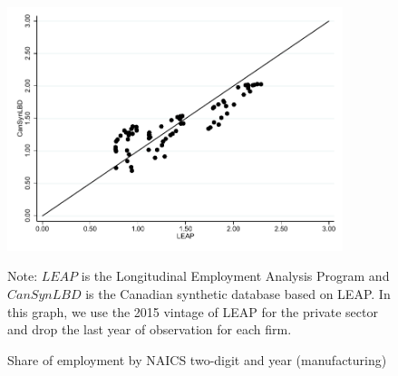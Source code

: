 \documentclass{article}
\begin{document}
\begin{figure} [H]
\centering
\caption{Share of employment by NAICS two-digit and year (manufacturing)} \label{EmploymentShareManufacturing}
\includegraphics[height=2.8in, width=.7\linewidth]{graphs/Share_of_employment_by_NAICS_two-digit_and_year_Manufacturing_bw.pdf} 
\begin{minipage}{0.85\textwidth}
{\footnotesize Note: $LEAP$ is the Longitudinal Employment Analysis Program and $CanSynLBD$ is the Canadian synthetic database based on LEAP. In this graph, we use the 2015 vintage of LEAP for the private sector and drop the last year of observation for each firm. \par}
\end{minipage}
\end{figure}
\end{document}
